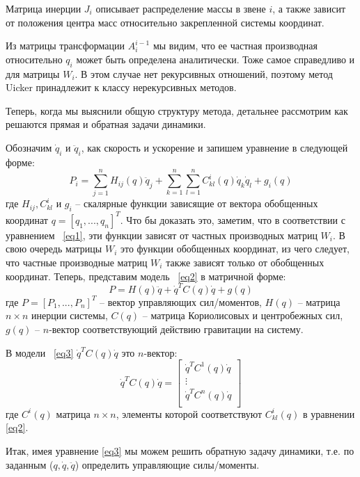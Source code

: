 Матрица инерции $J_i$ описывает распределение массы в звене $i$, а также зависит от положения центра масс относительно закрепленной системы координат.

Из матрицы трансформации $A_i^{i-1}$ мы видим, что ее частная производная относительно $q_i$ может быть определена аналитически. Тоже самое справедливо и для матрицы $W_i$. В этом случае нет рекурсивных отношений, поэтому метод Uicker принадлежит к классу нерекурсивных методов.

Теперь, когда мы выяснили общую структуру метода, детальнее рассмотрим как решаются прямая и обратная задачи динамики.

Обозначим $\dot q_i$ и $\ddot q_i$, как скорость и ускорение и запишем уравнение в следующей форме:
\begin{equation}\label{eq2}
P_i = \sum_{j=1}^{n}
H_{ij} (q) \ddot q_j
+
\sum_{k=1}^{n} \sum_{l=1}^{n}
C_{kl}^i (q) \dot q_k \dot q_l + g_i (q)
\end{equation}
где $H_{ij}, C_{kl}^i$ и $g_i$ -- скалярные функции зависящие от вектора обобщенных координат $q = [q_1,...,q_n]^T$. Что бы доказать это, заметим, что в соответствии с уравнением ~\ref{eq1}, эти функции зависят от частных производных матриц $W_i$. В свою очередь матрицы $W_i$ это функции обобщенных координат, из чего следует, что  частные производные матриц $W_i$ также зависят только от обобщенных координат. Теперь, представим модель ~\ref{eq2} в матричной форме:
\begin{equation}\label{eq3}
P = H(q) \ddot q + \dot q^T C(q) \dot q + g(q)
\end{equation}
где $P = [P_1,...,P_n]^T$ -- вектор управляющих сил/моментов, $H(q)$ -- матрица $n\times n$ инерции системы, $C(q)$ -- матрица Кориолисовых и центробежных сил, $g(q)$ -- $n$-вектор соответствующий действию гравитации на систему.

В модели ~\ref{eq3} $\dot q^T C(q) \dot q$ это $n$-вектор:
\begin{equation}
\dot q^T C(q) \dot q = 
\begin{bmatrix}
\dot q^T C^1(q) \dot q\\
\vdots\\
\dot q^T C^n(q) \dot q\\
\end{bmatrix}
\end{equation}
где $C^i(q)$ матрица $n \times n$, элементы которой соответствуют $C_{kl}^i (q)$ в уравнении \ref{eq2}. 

Итак, имея уравнение \ref{eq3} мы можем решить обратную задачу динамики, т.е. по заданным ($q, \dot q, \ddot q$) определить управляющие силы/моменты.

